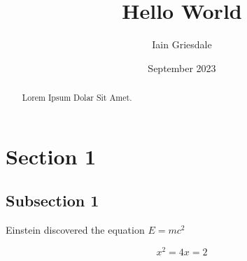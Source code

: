 \documentclass[titlepage]{article}
\title{Hello World}
\author{Iain Griesdale}
\date{September 2023}
\begin{document}
\maketitle

\begin{abstract}
    Lorem Ipsum Dolar Sit Amet.
\end{abstract}

\section{Section 1}

\subsection{Subsection 1}

Einstein discovered the equation $E=mc^2$

\begin{equation}
    x^2=4
    x=2
\end{equation}
\end{document}
